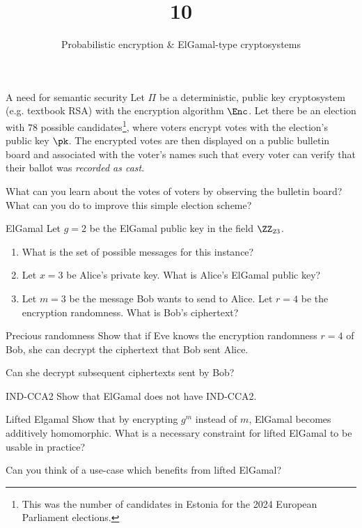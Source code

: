 \documentclass{practice}
\title{10}
\subtitle{Probabilistic encryption \& ElGamal-type cryptosystems}
\date{\DTMdate{2024-11-13}}
\begin{document}
\maketitle

\begin{task}{A need for semantic security}
  Let $\Pi$ be a deterministic, public key cryptosystem (e.g. textbook RSA) with the encryption algorithm $\Enc$.
  Let there be an election with $78$ possible candidates\footnote{This was the number of candidates in Estonia for the 2024 European Parliament elections.}, where voters encrypt votes with the election's public key $\pk$.
  The encrypted votes are then displayed on a public bulletin board and associated with the voter's names such that every voter can verify that their ballot was \emph{recorded as cast}.

  What can you learn about the votes of voters by observing the bulletin board?
  What can you do to improve this simple election scheme?
\end{task}

\begin{task}{ElGamal}
  Let $g = 2$ be the ElGamal public key in the field $\ZZ_{23}$.
  \begin{enumerate}
    \item What is the set of possible messages for this instance?
    \item Let $x = 3$ be Alice's private key.
    What is Alice's ElGamal public key?
    \item Let $m = 3$ be the message Bob wants to send to Alice.
    Let $r = 4$ be the encryption randomness.
    What is Bob's ciphertext?
  \end{enumerate}
\end{task}

\begin{task}{Precious randomness}
  Show that if Eve knows the encryption randomness $r=4$ of Bob, she can decrypt the ciphertext that Bob sent Alice.

  Can she decrypt subsequent ciphertexts sent by Bob?
\end{task}

\begin{task}{IND-CCA2}
  Show that ElGamal does not have IND-CCA2.
\end{task}

\begin{task}{Lifted Elgamal}
  Show that by encrypting $g^m$ instead of $m$, ElGamal becomes additively homomorphic.
  What is a necessary constraint for lifted ElGamal to be usable in practice?
  
  Can you think of a use-case which benefits from lifted ElGamal?
\end{task}
\end{document}
